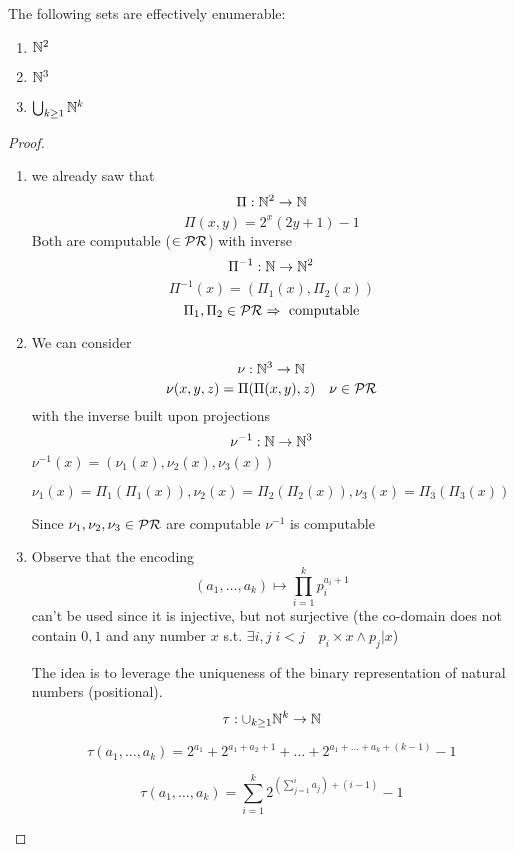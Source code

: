 
\begin{lemma}
  The following sets are effectively enumerable:
  \begin{enumerate}[label=(\arabic*)]
  \item $ \mathbb{N}^2 $
  \item $ \mathbb{N}^3 $
  \item $\bigcup_{k\geq 1} \mathbb{N}^k $
  \end{enumerate}
  \begin{proof}
    \begin{enumerate}[label=(\arabic*)]
    \item we already saw that \[\Pi : \mathbb{N}^2 \rightarrow
        \mathbb{N}\] \[\Pi(x,y) = 2^x(2y+1)-1\] Both are computable
      ($\in \mathcal{PR}$) with inverse
      \[\Pi^{-1} : \mathbb{N} \rightarrow \mathbb{N}^2\]
      \[\Pi^{-1}(x) = (\Pi_1(x), \Pi_2(x))\]
      \[\Pi_1, \Pi_2 \in \mathcal{PR} \Rightarrow \text{ computable}\]
    \item{
        We can consider \[\nu : \mathbb{N}^3 \rightarrow
          \mathbb{N} \] \[\nu(x,y,z)= \Pi(\Pi(x,y),z) \quad \nu \in \mathcal{PR}\] with
        the inverse built upon projections
        \[\nu^{-1} : \mathbb{N} \rightarrow \mathbb{N}^3\]
        \(\nu^{-1}(x) = (\nu_1(x), \nu_2(x), \nu_3(x))\)

        \(\nu_1(x) = \Pi_1(\Pi_1(x)), \nu_2(x) = \Pi_2(\Pi_2(x)),
        \nu_3(x) = \Pi_3(\Pi_3(x))\)

        Since $\nu_1, \nu_2, \nu_3 \in \mathcal{PR}$ are computable $\nu^{-1}$
        is computable }
    \item{ Observe that the encoding
        \[(a_1, \dots, a_k) \mapsto \prod^k_{i=1}p_i^{a_i+1}\] can't
        be used since it is injective, but not surjective (the
        co-domain does not contain $0,1$ and any number $x$
        s.t. \(\exists i,j \; i<j \quad p_i \times x \wedge p_j | x\))

        The idea is to leverage the uniqueness of the binary
        representation of natural numbers (positional).
        \[\tau : \cup_{k \geq 1} \mathbb{N}^k \rightarrow \mathbb{N} \]

        \[\tau (a_1, \dots, a_k ) = 2^{a_1}+2^{a_1+a_2+1}+ \dots +
          2^{a_1+\dots + a_k + (k-1)} - 1\]

        \[\tau (a_1, \dots, a_k ) = \sum^k_{i=1}2^{(\sum_{j=1}^i a_j)
            + (i-1)}-1\]

}
\end{enumerate}
\end{proof}
\end{lemma}
